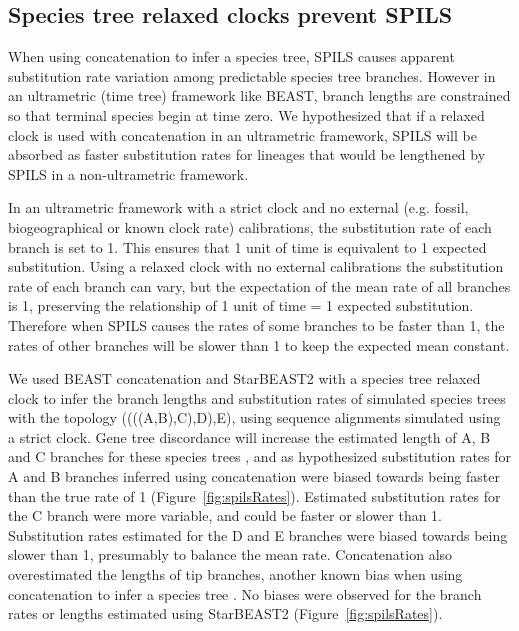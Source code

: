 \documentclass[nogrid]{MBE}%
\begin{document}
\subsection{Species tree relaxed clocks prevent SPILS}

When using concatenation to infer a species tree, SPILS causes apparent
substitution rate variation among predictable species tree branches. However
in an ultrametric (time tree) framework like BEAST, branch lengths are
constrained so that terminal species begin at time zero. We hypothesized that
if a relaxed clock is used with concatenation in an ultrametric framework,
SPILS will be absorbed as faster substitution rates for lineages that would be
lengthened by SPILS in a non-ultrametric framework.

In an ultrametric framework with a strict clock and no external (e.g. fossil,
biogeographical or known clock rate) calibrations, the substitution rate of
each branch is set to 1. This ensures that 1 unit of time is equivalent to 1
expected substitution. Using a relaxed clock with no external calibrations the
substitution rate of each branch can vary, but the expectation of the mean
rate of all branches is 1, preserving the relationship of 1 unit of time = 1
expected substitution. Therefore when SPILS causes the rates of some branches
to be faster than 1, the rates of other branches will be slower than 1 to keep
the expected mean constant.

We used BEAST concatenation and StarBEAST2 with a species tree relaxed clock
to infer the branch lengths and substitution rates of simulated species trees
with the topology ((((A,B),C),D),E), using sequence alignments simulated using
a strict clock. Gene tree discordance will increase the estimated length of A,
B and C branches for these species trees \citep{Mendes01072016}, and as
hypothesized substitution rates for A and B branches inferred using
concatenation were biased towards being faster than the true rate of 1
(Figure~\ref{fig:spilsRates}). Estimated substitution rates for the C branch
were more variable, and could be faster or slower than 1. Substitution rates
estimated for the D and E branches were biased towards being slower than 1,
presumably to balance the mean rate. Concatenation also overestimated the
lengths of tip branches, another known bias when using concatenation to infer
a species tree \citep{Ogilvie01052016}. No biases were observed for the branch
rates or lengths estimated using StarBEAST2 (Figure~\ref{fig:spilsRates}).
\end{document}
